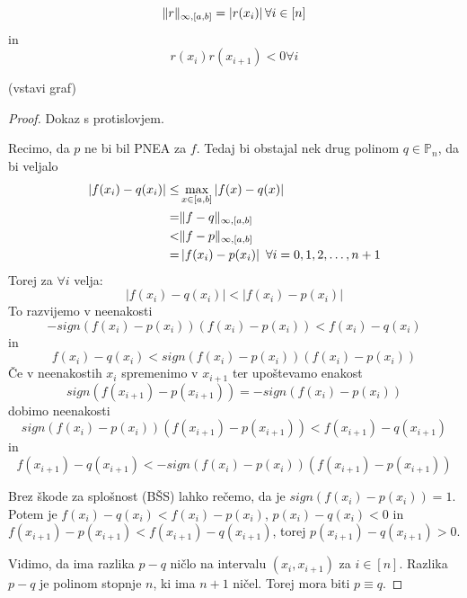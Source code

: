 \documentclass[a4paper,12pt]{article}
\DeclarePairedDelimiter\norm{\lVert}{\rVert}
\theoremstyle{definition}
\theoremstyle{remark}
\newcommand{\Pp}{\mathbb{P}}
\begin{document}
\begin{equation*}
    \norm{r}_{\infty, [a, b]} = \left| r(x_i) \right| \forall i \in [n]
\end{equation*}
in
\begin{equation*}
    r(x_i)r(x_{i+1}) < 0 \forall i
\end{equation*}

(vstavi graf)

\begin{proof}
    Dokaz s protislovjem.

    Recimo, da $p$ ne bi bil PNEA za $f$. Tedaj bi obstajal nek drug polinom $q \in \Pp_n$, da bi veljalo
    \begin{align*}
        \left| f(x_i) - q(x_i) \right| \leq& \max_{x \in [a, b]} \left| f(x) - q(x) \right| \\
                             =& \norm{f - q}_{\infty, [a, b]} \\
                             <& \norm{f - p}_{\infty, [a, b]} \\
                             =& \left| f(x_i) - p(x_i) \right| \text{  } \forall i = 0, 1, 2, \dots, n+1
    \end{align*}
    Torej za $\forall i $ velja:
    \begin{equation*}
        \left| f(x_i) - q(x_i) \right| < \left| f(x_i) - p(x_i) \right|
    \end{equation*}
    To razvijemo v neenakosti
    \begin{equation*}
        - sign(f(x_i) - p(x_i)) (f(x_i) - p(x_i)) < f(x_i) - q(x_i)
    \end{equation*}
    in
    \begin{equation*}
        f(x_i) - q(x_i) < sign(f(x_i) - p(x_i)) (f(x_i) - p(x_i))
    \end{equation*}
    Če v neenakostih $x_i$ spremenimo v $x_{i+1}$ ter upoštevamo enakost
    \begin{equation*}
        sign(f(x_{i+1}) - p(x_{i+1})) = - sign(f(x_i) - p(x_i))
    \end{equation*}
    dobimo neenakosti
    \begin{equation*}
        sign(f(x_i) - p(x_i)) (f(x_{i+1}) - p(x_{i+1})) < f(x_{i+1}) - q(x_{i+1})
    \end{equation*}
    in
    \begin{equation*}
        f(x_{i+1}) - q(x_{i+1}) < - sign(f(x_i) - p(x_i)) (f(x_{i+1}) - p(x_{i+1}))
    \end{equation*}

    Brez škode za splošnost (BŠS) lahko rečemo, da je $sign(f(x_i) - p(x_i)) = 1$. Potem je $f(x_i) - q(x_i) < f(x_i) - p(x_i)$, $p(x_i) - q(x_i) < 0$ in
    $f(x_{i+1}) - p(x_{i+1}) < f(x_{i+1}) - q(x_{i+1})$, torej $p(x_{i+1}) - q(x_{i+1}) > 0$.

    Vidimo, da ima razlika $p-q$ ničlo na intervalu $(x_i, x_{i+1})$ za $i \in [n]$. Razlika $p-q$ je polinom stopnje $n$, ki ima $n+1$ ničel.
    Torej mora biti $p \equiv q$.
\end{proof}
\end{document}
